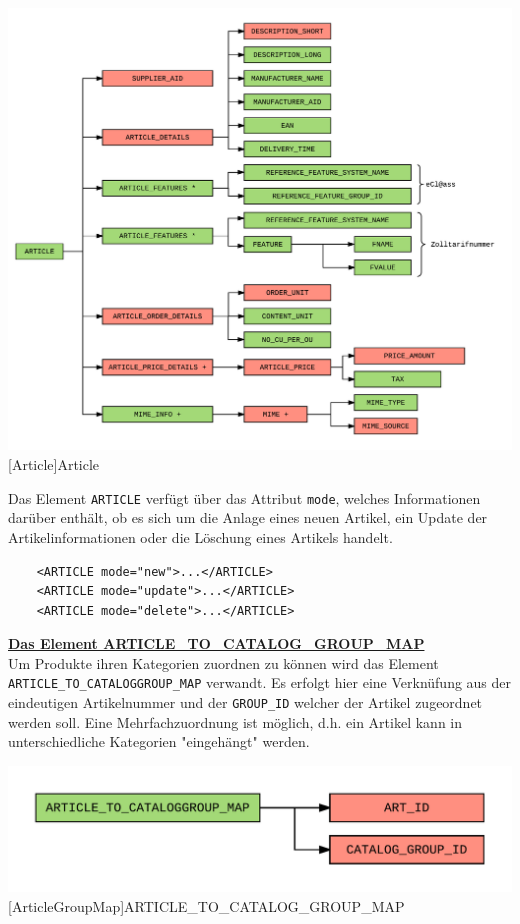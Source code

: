 	\begin{minipage}{\linewidth}
		\vspace{1em}
		\centering
		\includegraphics[width=1\linewidth]{img/Article}
		[Article]{Article}
		\label{fig:header}
		\vspace{1em}
	\end{minipage}
	
	Das Element \texttt{ARTICLE} verfügt über das Attribut \texttt{mode}, welches Informationen darüber enthält, ob es sich um die Anlage eines neuen Artikel, ein Update der Artikelinformationen oder die Löschung eines Artikels handelt.
	
	\begin{lstlisting}
	<ARTICLE mode="new">...</ARTICLE>
	<ARTICLE mode="update">...</ARTICLE>
	<ARTICLE mode="delete">...</ARTICLE>
	\end{lstlisting}
	\pagebreak
	
	
	\textbf{\underline{Das Element ARTICLE\_TO\_CATALOG\_GROUP\_MAP}}\\
	
	Um Produkte ihren Kategorien zuordnen zu können wird das Element \texttt{ARTICLE\_TO\_CATALOGGROUP\_MAP} verwandt. Es erfolgt hier eine Verknüfung aus der eindeutigen Artikelnummer und der \texttt{GROUP\_ID} welcher der Artikel zugeordnet werden soll. Eine Mehrfachzuordnung ist möglich, d.h. ein Artikel kann in unterschiedliche Kategorien "eingehängt" werden.
	
	\begin{minipage}{\linewidth}
		\vspace{1em}
		\centering
		\includegraphics[width=0.7\linewidth]{img/articleGroupMap}
		[ArticleGroupMap]{ARTICLE\_TO\_CATALOG\_GROUP\_MAP}
		\label{fig:header}
		\vspace{1em}
	\end{minipage}
	
